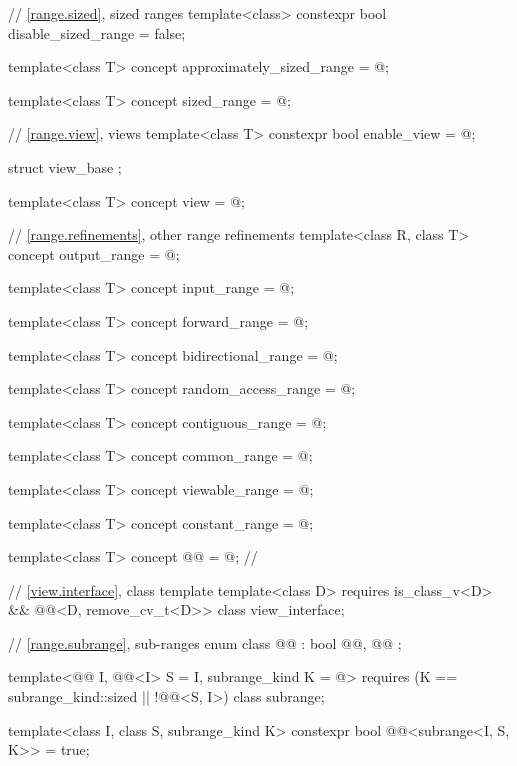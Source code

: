 \begin{codeblock}
{  // \ref{range.sized}, sized ranges
  template<class>
    constexpr bool disable_sized_range = false;

  template<class T>
    concept approximately_sized_range = @\seebelow@;

  template<class T>
    concept sized_range = @\seebelow@;

  // \ref{range.view}, views
  template<class T>
    constexpr bool enable_view = @\seebelow@;

  struct view_base {};

  template<class T>
    concept view = @\seebelow@;

  // \ref{range.refinements}, other range refinements
  template<class R, class T>
    concept output_range = @\seebelow@;

  template<class T>
    concept input_range = @\seebelow@;

  template<class T>
    concept forward_range = @\seebelow@;

  template<class T>
    concept bidirectional_range = @\seebelow@;

  template<class T>
    concept random_access_range = @\seebelow@;

  template<class T>
    concept contiguous_range = @\seebelow@;

  template<class T>
    concept common_range = @\seebelow@;

  template<class T>
    concept viewable_range = @\seebelow@;

  template<class T>
    concept constant_range = @\seebelow@;

  template<class T>
    concept @@ = @\seebelownc@;              // \expos

  // \ref{view.interface}, class template 
  template<class D>
    requires is_class_v<D> && @@<D, remove_cv_t<D>>
  class view_interface;

  // \ref{range.subrange}, sub-ranges
  enum class @@ : bool { @@, @@ };

  template<@@ I, @@<I> S = I, subrange_kind K = @\seebelow@>
    requires (K == subrange_kind::sized || !@@<S, I>)
  class subrange;

  template<class I, class S, subrange_kind K>
    constexpr bool @@<subrange<I, S, K>> = true;

}
\end{codeblock}

